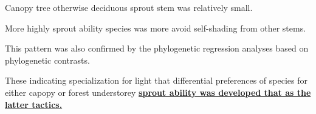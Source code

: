 \documentclass[a0, 25, plainboxedsections]{sciposter} %
\begin{document}
\begin{multicols}{2}
\begin{mdframed}[style=conclusion.frame,frametitle={\textbf{\Large{\faFlagAlt \vspace{0.02em} SYNTHESIS: {Sprout ability is evolved to against tree height, and promoted species coexistence.}}}}]
{    \faCaretRight Canopy tree otherwise deciduous sprout stem was relatively small.
    
    \faCaretRight More highly sprout ability species was more avoid self-shading from other stems.
    
    \faCaretRight This pattern was also confirmed by the phylogenetic regression analyses based on phylogenetic contrasts.
  }
  
  \vspace{0.4em}
  \faHandLeft These indicating specialization for light that differential preferences of species for either capopy or forest understorey \textbf{\underline{sprout ability was developed that as the latter tactics.}}
  
 
 
\end{mdframed}

\end{multicols}
\begin{mdframed}[style=section.frame]
  \LARGE\textbf{\color{white}{MATERIALS AND METHODS}}
\end{mdframed}\vspace{-1.2em}
\end{document}
